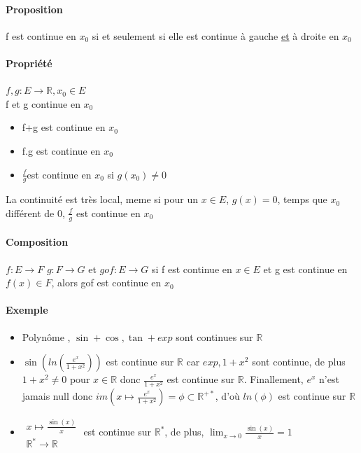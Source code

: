 \paragraph{Proposition} f est continue en $x_0$ si et seulement si elle est continue à gauche \ul{et} à droite en $x_0$
\paragraph{Propriété} $f, g : E \rightarrow \mathbb{R}, x_0 \in E$ ~\\
f et g continue en $x_0$ 

\begin{itemize}
	\item f+g est continue en $x_0$
	\item f.g est continue en $x_0$
	\item $\frac{f}{g} $est continue en $x_0$ si $g(x_0) \neq 0$
\end{itemize}
La continuité est très local, meme si pour un $x \in E$, $g(x) = 0$, temps que $x_0$ différent de 0, $\frac{f}{g}$ est continue en $x_0$

\paragraph{Composition} $f:E \rightarrow F$ $g:F \rightarrow G$ et $gof : E \rightarrow G$
si f est continue en $x \in E$ et g est continue en $f(x) \in F$, alors gof est continue en $x_0$

\paragraph{Exemple} \begin{itemize}
	\item Polynôme , $\sin+\cos, \tan + exp$ sont continues sur $\mathbb{R}$
	\item $\sin(ln(\frac{e^x}{1+x^2}))$ est continue sur $\mathbb{R}$ car $exp, 1+x^2$ sont continue, de plus $1+x^2 \neq 0$ pour $x \in \mathbb{R}$ donc $\frac{e^x}{1+x^2}$ est continue sur $\mathbb{R}$.
	Finallement, $e^x$ n'est jamais null donc $im(x\mapsto \frac{e^x}{1+x^2}) = \phi \subset \mathbb{R}^{+*}$, d'où $ln(\phi)$ est continue sur $\mathbb{R}$

\item $\begin{array}{l}
	x\mapsto \frac{\sin(x)}{x} \\
	\mathbb{R^*} \rightarrow \mathbb{R}
\end{array}$
	 est continue sur $\mathbb{R}^*$, de plus, $\lim_{x \to 0} \frac{\sin(x)}{x} = 1$ 
\end{itemize}

